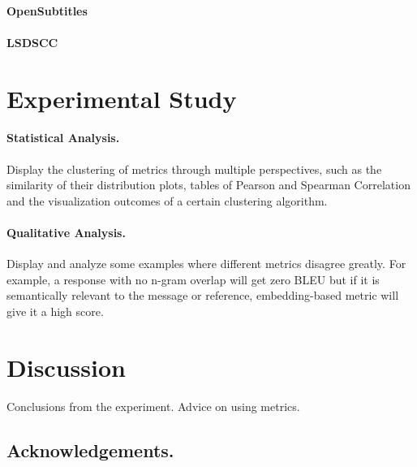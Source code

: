 \documentclass[runningheads]{llncs}
\begin{document}
\paragraph{OpenSubtitles}
\paragraph{LSDSCC}


\section{Experimental Study}
\paragraph{Statistical Analysis.}
Display the clustering of metrics through multiple perspectives,
such as the similarity of their distribution plots, tables of Pearson and Spearman Correlation
and the visualization outcomes of a certain clustering algorithm.

\paragraph{Qualitative Analysis.}
Display and analyze some examples where different metrics disagree greatly.
For example, a response with no n-gram overlap will get zero BLEU but if it is semantically
relevant to the message or reference, embedding-based metric will give it a high score.

\section{Discussion}
Conclusions from the experiment.
Advice on using metrics.

\subsection*{Acknowledgements.}



\end{document}
